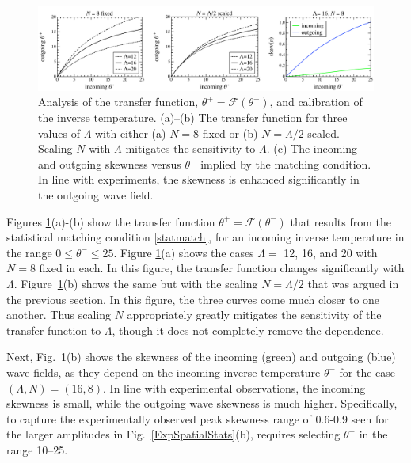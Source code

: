 \documentclass[11pt]{article}
\newcommand{\lamfac}{N}
\newcommand{\thup}{\theta^{-}}
\newcommand{\thdn}{\theta^{+}}
\newcommand{\transf}{\mathcal{F}}
\begin{document}
\begin{figure}%
\begin{center}
\includegraphics[width = 0.99 \linewidth]{Figs/transfig.pdf}
\caption{
Analysis of the transfer function, $\thdn = \transf \left( \thup \right)$, and calibration of the inverse temperature. (a)--(b) The transfer function for three values of $\Lambda$ with either (a) $\lamfac = 8$ fixed or (b) $\lamfac = \Lambda/2$ scaled. Scaling $\lamfac$ with $\Lambda$ mitigates the sensitivity to $\Lambda$. (c) The incoming and outgoing skewness versus $\thup$ implied by the matching condition. In line with experiments, the skewness is enhanced significantly in the outgoing wave field.
}
\label{transfig}
\end{center}
\end{figure}
 
	Figures \ref{transfig}(a)-(b) show the transfer function $\thdn = \transf(\thup)$ that results from the statistical matching condition \eqref{statmatch}, for an incoming inverse temperature in the range $0 \le \thup \le 25$. Figure \ref{transfig}(a) shows the cases $\Lambda = $ 12, 16, and 20 with $\lamfac = 8$ fixed in each. In this figure, the transfer function changes significantly with $\Lambda$. Figure~\ref{transfig}(b) shows the same but with the scaling $\lamfac = \Lambda/2$ that was argued in the previous section. In this figure, the three curves come much closer to one another. Thus scaling $\lamfac$ appropriately greatly mitigates the sensitivity of the transfer function to $\Lambda$, though it does not completely remove the dependence.
 
	Next, Fig.~\ref{transfig}(b) shows the skewness of the incoming (green) and outgoing (blue) wave fields, as they depend on the incoming inverse temperature $\thup$ for the case $(\Lambda, \lamfac) = (16, 8)$. In line with experimental observations, the incoming skewness is small, while the outgoing wave skewness is much higher. Specifically, to capture the experimentally observed peak skewness range of 0.6-0.9 seen for the larger amplitudes in Fig.~\ref{ExpSpatialStats}(b), requires selecting $\thup$ in the range 10--25.
\end{document}
